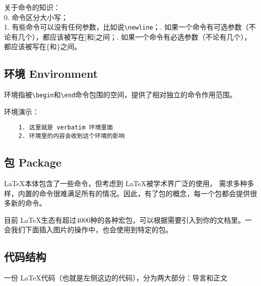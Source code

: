 关于命令的知识：\\
0. 命令区分大小写； \\
1. 有些命令可以没有任何参数，比如说\verb|\newline|；. 如果一个命令有可选参数（不论有几个），都应该被写在[和]之间；. 如果一个命令有必选参数（不论有几个），都应该被写在\{和\}之间。\newline




\subsection{环境 Environment} 
环境指被\verb=\begin=和\verb=\end=命令包围的空间，提供了相对独立的命令作用范围。

环境演示：
\begin{verbatim}
    1. 这里就是 verbatim 环境里面
    2. 环境里的内容会收到这个环境的影响
\end{verbatim}

\subsection{包 Package}
\LaTeX 本体包含了一些命令，但考虑到 \LaTeX 被学术界广泛的使用， 需求多种多样，内置的命令很难满足所有的情况。因此，有了包的概念，每一个包都会提供很多新的命令。

目前 \LaTeX 生态有超过4000种的各种宏包，可以根据需要引入到你的文档里。一会我们下面插入图片的操作中，也会使用到特定的包。


\subsection{代码结构}
一份 \LaTeX 代码（也就是左侧这边的代码），分为两大部分：导言和正文


